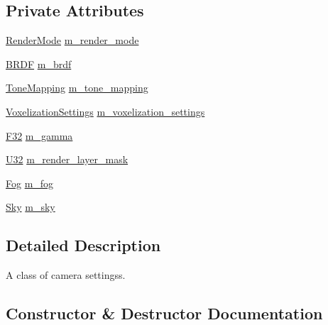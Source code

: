 \subsection*{Private Attributes}
\begin{DoxyCompactItemize}
\item 
\hyperlink{namespacemage_1_1rendering_aeb14ce7610cc9391f4e01be027b91dcc}{Render\+Mode} \hyperlink{classmage_1_1rendering_1_1_camera_settings_adf563f8bd1ee5cecd126c6b4731de6e5}{m\+\_\+render\+\_\+mode}
\item 
\hyperlink{namespacemage_1_1rendering_ab8fe8684ca4bd74ba3a394b00cf125b5}{B\+R\+DF} \hyperlink{classmage_1_1rendering_1_1_camera_settings_a18daf9b9c8c7319e7db996a406aa0a43}{m\+\_\+brdf}
\item 
\hyperlink{namespacemage_1_1rendering_a789e4b7d9a8cc831b065e9c6bb7430e9}{Tone\+Mapping} \hyperlink{classmage_1_1rendering_1_1_camera_settings_a5a88df673aa475c5087bf74620048580}{m\+\_\+tone\+\_\+mapping}
\item 
\hyperlink{classmage_1_1rendering_1_1_voxelization_settings}{Voxelization\+Settings} \hyperlink{classmage_1_1rendering_1_1_camera_settings_a4d4cc0955f6bac39a57382a15fe81d64}{m\+\_\+voxelization\+\_\+settings}
\item 
\hyperlink{namespacemage_aa97e833b45f06d60a0a9c4fc22ae02c0}{F32} \hyperlink{classmage_1_1rendering_1_1_camera_settings_aec2e610b98b3657f49944a59c4717bee}{m\+\_\+gamma}
\item 
\hyperlink{namespacemage_a41c104c036fba3756a74e19f793eeaa1}{U32} \hyperlink{classmage_1_1rendering_1_1_camera_settings_ab6d4995fe7531563c5c5c8db1a0a1c9f}{m\+\_\+render\+\_\+layer\+\_\+mask}
\item 
\hyperlink{classmage_1_1rendering_1_1_fog}{Fog} \hyperlink{classmage_1_1rendering_1_1_camera_settings_a173329d1022c717efe29e33eaa554d18}{m\+\_\+fog}
\item 
\hyperlink{classmage_1_1rendering_1_1_sky}{Sky} \hyperlink{classmage_1_1rendering_1_1_camera_settings_a62c726791db2c8ee20ef404e15c5f26c}{m\+\_\+sky}
\end{DoxyCompactItemize}


\subsection{Detailed Description}
A class of camera settingss. 

\subsection{Constructor \& Destructor Documentation}
\hypertarget{classmage_1_1rendering_1_1_camera_settings_a46be4ca54bacf2597672a2e944f9fef6}{}\label{classmage_1_1rendering_1_1_camera_settings_a46be4ca54bacf2597672a2e944f9fef6} 
